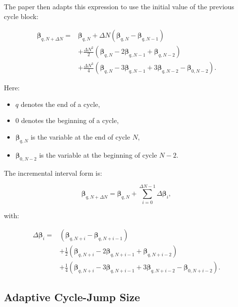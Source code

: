 \documentclass[11pt,a4paper]{article}
\begin{document}
The paper then adapts this expression to use the initial value of the previous cycle block:

\begin{equation}
\begin{aligned}
\bm{\beta}_{q,N+\Delta N}
=
&\bm{\beta}_{q,N}
+
\Delta N
(\bm{\beta}_{q,N}-\bm{\beta}_{q,N-1}) \\
&+
\frac{\Delta N^2}{2}
(\bm{\beta}_{q,N}-2\bm{\beta}_{q,N-1}+\bm{\beta}_{q,N-2}) \\
&+
\frac{\Delta N^3}{4}
(\bm{\beta}_{q,N}
-3\bm{\beta}_{q,N-1}
+3\bm{\beta}_{q,N-2}
-\bm{\beta}_{0,N-2}) .
\end{aligned}
\end{equation}

Here:

\begin{itemize}
    \item $q$ denotes the end of a cycle,
    \item $0$ denotes the beginning of a cycle,
    \item $\bm{\beta}_{q,N}$ is the variable at the end of cycle $N$,
    \item $\bm{\beta}_{0,N-2}$ is the variable at the beginning of cycle $N-2$.
\end{itemize}

The incremental interval form is:

\begin{equation}
\bm{\beta}_{q,N+\Delta N}
=
\bm{\beta}_{q,N}
+
\sum_{i=0}^{\Delta N-1}
\Delta \bm{\beta}_i ,
\end{equation}

with:

\begin{equation}
\begin{aligned}
\Delta \bm{\beta}_i
=
&\left(\bm{\beta}_{q,N+i}-\bm{\beta}_{q,N+i-1}\right) \\
&+
\frac{1}{2}
\left(\bm{\beta}_{q,N+i}
-2\bm{\beta}_{q,N+i-1}
+\bm{\beta}_{q,N+i-2}\right) \\
&+
\frac{1}{4}
\left(\bm{\beta}_{q,N+i}
-3\bm{\beta}_{q,N+i-1}
+3\bm{\beta}_{q,N+i-2}
-\bm{\beta}_{0,N+i-2}\right) .
\end{aligned}
\end{equation}

\subsection{Adaptive Cycle-Jump Size}
\end{document}
